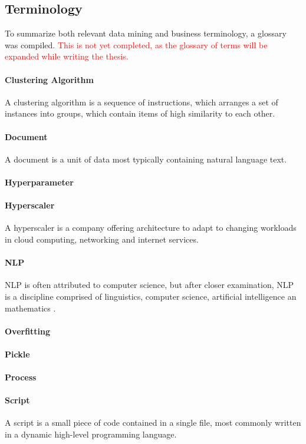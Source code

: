 \subsection{Terminology}
To summarize both relevant data mining and business terminology, a glossary was compiled.
\textcolor{red}{This is not yet completed, as the glossary of terms will be expanded while writing the thesis.}
	\paragraph{Clustering Algorithm} A clustering algorithm is a sequence of instructions, which arranges a set of instances into groups, which contain items of high similarity to each other.
	\paragraph{Document} A document is a unit of data most typically containing natural language text.
	\paragraph{Hyperparameter}
	\paragraph{Hyperscaler} A hyperscaler is a company offering architecture to adapt to changing workloads in cloud computing, networking and internet services.
	\paragraph{\acf{NLP}} \ac{NLP} is often attributed to computer science, but after closer examination, \ac{NLP} is a discipline comprised of linguistics, computer science, artificial intelligence an mathematics \cite{chowdhury2003}.
	\paragraph{Overfitting}
	\paragraph{Pickle}
	\paragraph{Process}
	\paragraph{Script} A script is  a small piece of code contained in a single file, most commonly written in a dynamic high-level programming language.
